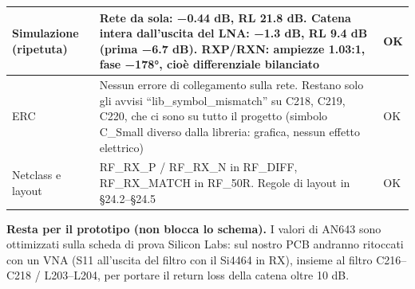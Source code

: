 {\begin{longtable}{>{\raggedright\arraybackslash}p{}>{\raggedright\arraybackslash}p{}>{\raggedright\arraybackslash}p{}}
Simulazione (ripetuta) & Rete da sola: −0.44 dB, RL 21.8 dB. Catena intera dall'uscita del LNA: −1.3 dB, RL 9.4 dB (prima −6.7 dB). RXP/\allowbreak{}RXN: ampiezze 1.03:1, fase −178°, cioè differenziale bilanciato & OK \\\midrule[0.15pt]
ERC & Nessun errore di collegamento sulla rete. Restano solo gli avvisi \textquotedblleft{}lib\_\allowbreak{}symbol\_\allowbreak{}mismatch\textquotedblright{} su C218, C219, C220, che ci sono su tutto il progetto (simbolo C\_\allowbreak{}Small diverso dalla libreria: grafica, nessun effetto elettrico) & OK \\\midrule[0.15pt]
Netclass e layout & RF\_\allowbreak{}RX\_\allowbreak{}P /\allowbreak{} RF\_\allowbreak{}RX\_\allowbreak{}N in RF\_\allowbreak{}DIFF, RF\_\allowbreak{}RX\_\allowbreak{}MATCH in RF\_\allowbreak{}50R. Regole di layout in §24.2–§24.5 & OK \\
\end{longtable}}

\textbf{Resta per il prototipo (non blocca lo schema).} I valori di AN643 sono ottimizzati sulla scheda di prova Silicon Labs: sul nostro PCB andranno ritoccati con un VNA (S11 all'uscita del filtro con il Si4464 in RX), insieme al filtro C216–C218 /\allowbreak{} L203–L204, per portare il return loss della catena oltre 10 dB.
